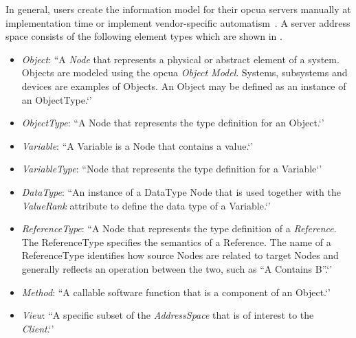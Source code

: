 \documentclass[
a4paper,
twoside,
headsepline,
cleardoublepage=empty,
parskip=half,
draft=false
]{scrbook}
\begin{document}
				In general, users create the information model for their \gls{opcua} servers manually at implementation time or implement vendor-specific automatism~\cite{henssen2014online}.
				A server address space consists of the following element types which are shown in .

				\begin{itemize}

					\item \textit{Object}: ``A \textit{Node} that represents a physical or abstract element of a system. Objects are modeled using the \gls{opcua} \textit{Object Model}. Systems, subsystems and devices are examples of Objects. An Object may be defined as an instance of an ObjectType.`'~\cite{opcfoundation2017part1}

					\item \textit{ObjectType}: ``A Node that represents the type definition
					for an Object.`'~\cite{opcfoundation2017part1}

					\item \textit{Variable}: ``A Variable is a Node that contains a value.`'~\cite{opcfoundation2017part1}

					\item \textit{VariableType}: ``Node that represents the type definition for a Variable`'~\cite{opcfoundation2018part3}

					\item \textit{DataType}: ``An instance of a DataType Node that is used together with the \textit{ValueRank} attribute to define the data type of a Variable.`'~\cite{opcfoundation2018part3}

					\item \textit{ReferenceType}: ``A Node that represents the type definition of a \textit{Reference}. The ReferenceType specifies the semantics of a Reference. The name of a ReferenceType identifies how source Nodes are related to target Nodes and generally reflects an operation between the two, such as “A Contains B”.`'~\cite{opcfoundation2017part1}

					\item \textit{Method}: ``A callable software function that is a component of an Object.`'~\cite{opcfoundation2017part1}

					\item \textit{View}: ``A specific subset of the \textit{AddressSpace} that is of interest to the \textit{Client}.`'~\cite{opcfoundation2017part1}

				\end{itemize}
\end{document}

